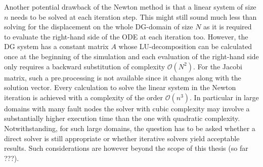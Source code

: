 Another potential drawback of the Newton method is that a linear system of size $n$ needs to be solved at each iteration step. This might still sound much less than solving for the displacement on the whole DG-domain of size $N$ as it is required to evaluate the right-hand side of the ODE at each iteration too. However, the DG system has a constant matrix $A$ whose LU-decomposition can be calculated once at the beginning of the simulation and each evaluation of the right-hand side only requires a backward substitution of complexity $\mathcal{O}\left(N^2\right)$. For the Jacobi matrix, such a pre.processing is not available since it changes along with the solution vector. Every calculation to solve the linear system in the Newton iteration is achieved with a complexity of the order $\mathcal{O}\left(n^3\right)$. In particular in large domains with many fault nodes the solver with cubic complexity may involve a substantially higher execution time than the one with quadratic complexity. Notwithstanding, for such large domains, the question has to be asked whether a direct solver is still appropriate or whether iterative solvers yield acceptable results. Such considerations are however beyond the scope of this thesis (so far ???).

